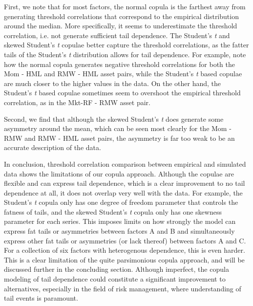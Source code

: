 First, we note that for most factors, the normal copula is the farthest away from generating threshold correlations that correspond to the empirical distribution around the median. More specifically, it seems to underestimate the threshold correlation, i.e. not generate sufficient tail dependence. The Student's \textit{t} and skewed Student's \textit{t} copulae better capture the threshold correlations, as the fatter tails of the Student's \textit{t} distribution allows for tail dependence. For example, note how the normal copula generates negative threshold correlations for both the Mom - HML and RMW - HML asset pairs, while the Student's \textit{t} based copulae are much closer to the higher values in the data. On the other hand, the Student's \textit{t} based copulae sometimes seem to overshoot the empirical threshold correlation, as in the Mkt-RF - RMW asset pair.

Second, we find that although the skewed Student's \textit{t} does generate some asymmetry around the mean, which can be seen most clearly for the Mom - RMW and RMW - HML asset pairs, the asymmetry is far too weak to be an accurate description of the data. 

In conclusion, threshold correlation comparison between empirical and simulated data shows the limitations of our copula approach. Although the copulae are flexible and can express tail dependence, which is a clear improvement to no tail dependence at all, it does not overlap very well with the data. For example, the Student's \textit{t} copula only has one degree of freedom parameter that controls the fatness of tails, and the skewed Student's \textit{t} copula only has one skewness parameter for each series. This imposes limits on how strongly the model can express fat tails or asymmetries between factors A and B and simultaneously express other fat tails or asymmetries (or lack thereof) between factors A and C. For a collection of six factors with heterogenous dependence, this is even harder. This is a clear limitation of the quite parsimonious copula approach, and will be discussed further in the concluding section. Although imperfect, the copula modeling of tail dependence could constitute a significant improvement to alternatives, especially in the field of risk management, where understanding of tail events is paramount.

